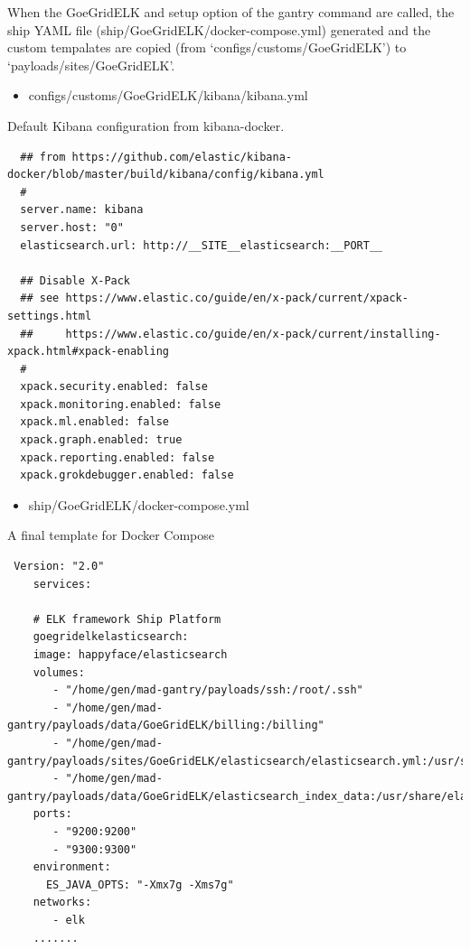 \documentclass[]{article}
\begin{document}
When the GoeGridELK and setup option of the gantry command are called,
the ship YAML file (ship/GoeGridELK/docker-compose.yml) generated and
the custom tempalates are copied (from `configs/customs/GoeGridELK') to
`payloads/sites/GoeGridELK'.

\begin{itemize}
\itemsep1pt\parskip0pt
\item
  configs/customs/GoeGridELK/kibana/kibana.yml
\end{itemize}

Default Kibana configuration from kibana-docker.

\begin{verbatim}
  ## from https://github.com/elastic/kibana-docker/blob/master/build/kibana/config/kibana.yml
  #
  server.name: kibana
  server.host: "0"
  elasticsearch.url: http://__SITE__elasticsearch:__PORT__
  
  ## Disable X-Pack
  ## see https://www.elastic.co/guide/en/x-pack/current/xpack-settings.html
  ##     https://www.elastic.co/guide/en/x-pack/current/installing-xpack.html#xpack-enabling
  #
  xpack.security.enabled: false
  xpack.monitoring.enabled: false
  xpack.ml.enabled: false
  xpack.graph.enabled: true
  xpack.reporting.enabled: false
  xpack.grokdebugger.enabled: false
\end{verbatim}

\begin{itemize}
\itemsep1pt\parskip0pt
\item
  ship/GoeGridELK/docker-compose.yml
\end{itemize}

A final template for Docker Compose

\begin{verbatim}
 Version: "2.0"
    services:
    
    # ELK framework Ship Platform
    goegridelkelasticsearch:
    image: happyface/elasticsearch
    volumes:
       - "/home/gen/mad-gantry/payloads/ssh:/root/.ssh"
       - "/home/gen/mad-gantry/payloads/data/GoeGridELK/billing:/billing"
       - "/home/gen/mad-gantry/payloads/sites/GoeGridELK/elasticsearch/elasticsearch.yml:/usr/share/elasticsearch/config/elasticsearch.yml"
       - "/home/gen/mad-gantry/payloads/data/GoeGridELK/elasticsearch_index_data:/usr/share/elasticsearch/data"
    ports:
       - "9200:9200"
       - "9300:9300"
    environment:
      ES_JAVA_OPTS: "-Xmx7g -Xms7g"
    networks:
       - elk
    .......
\end{verbatim}
\end{document}

